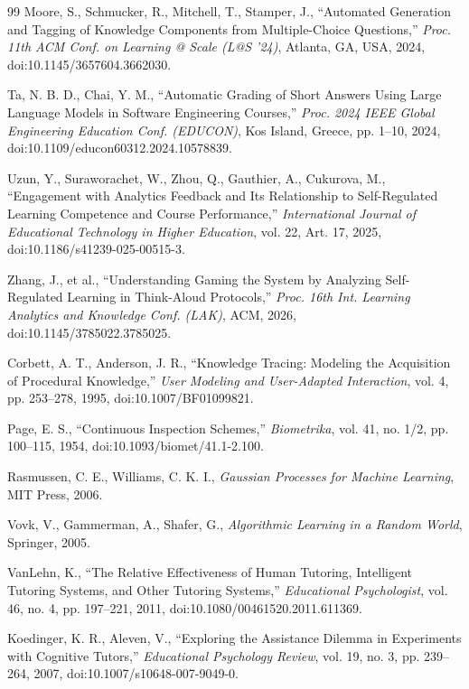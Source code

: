 \documentclass[12pt]{report}
\begin{document}
\begin{thebibliography}{99}
 Moore, S., Schmucker, R., Mitchell, T., Stamper, J., ``Automated Generation and Tagging of Knowledge Components from Multiple-Choice Questions,'' \textit{Proc. 11th ACM Conf. on Learning @ Scale (L@S '24)}, Atlanta, GA, USA, 2024, doi:10.1145/3657604.3662030.

 Ta, N. B. D., Chai, Y. M., ``Automatic Grading of Short Answers Using Large Language Models in Software Engineering Courses,'' \textit{Proc. 2024 IEEE Global Engineering Education Conf. (EDUCON)}, Kos Island, Greece, pp. 1--10, 2024, doi:10.1109/educon60312.2024.10578839.

 Uzun, Y., Suraworachet, W., Zhou, Q., Gauthier, A., Cukurova, M., ``Engagement with Analytics Feedback and Its Relationship to Self-Regulated Learning Competence and Course Performance,'' \textit{International Journal of Educational Technology in Higher Education}, vol. 22, Art. 17, 2025, doi:10.1186/s41239-025-00515-3.

 Zhang, J., et al., ``Understanding Gaming the System by Analyzing Self-Regulated Learning in Think-Aloud Protocols,'' \textit{Proc. 16th Int. Learning Analytics and Knowledge Conf. (LAK)}, ACM, 2026, doi:10.1145/3785022.3785025.

 Corbett, A. T., Anderson, J. R., ``Knowledge Tracing: Modeling the Acquisition of Procedural Knowledge,'' \textit{User Modeling and User-Adapted Interaction}, vol. 4, pp. 253--278, 1995, doi:10.1007/BF01099821.

 Page, E. S., ``Continuous Inspection Schemes,'' \textit{Biometrika}, vol. 41, no. 1/2, pp. 100--115, 1954, doi:10.1093/biomet/41.1-2.100.

 Rasmussen, C. E., Williams, C. K. I., \textit{Gaussian Processes for Machine Learning}, MIT Press, 2006.

 Vovk, V., Gammerman, A., Shafer, G., \textit{Algorithmic Learning in a Random World}, Springer, 2005.

 VanLehn, K., ``The Relative Effectiveness of Human Tutoring, Intelligent Tutoring Systems, and Other Tutoring Systems,'' \textit{Educational Psychologist}, vol. 46, no. 4, pp. 197--221, 2011, doi:10.1080/00461520.2011.611369.

 Koedinger, K. R., Aleven, V., ``Exploring the Assistance Dilemma in Experiments with Cognitive Tutors,'' \textit{Educational Psychology Review}, vol. 19, no. 3, pp. 239--264, 2007, doi:10.1007/s10648-007-9049-0.


\end{thebibliography}
\end{document}
